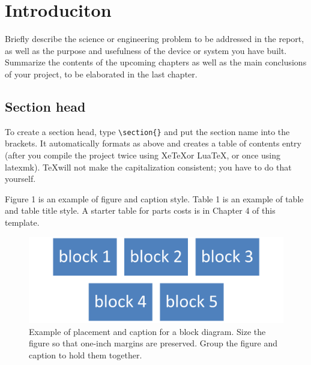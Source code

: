 \chapter{Introduciton}
Briefly describe the science or engineering problem to be addressed in the report, as well as the purpose and usefulness of the device or system you have built. Summarize the contents of the upcoming chapters as well as the main conclusions of your project, to be elaborated in the last chapter.

\section{Section head}
To create a section head, type \verb|\section{}| and put the section name into the brackets. It automatically formats as above and creates a table of contents entry (after you compile the project twice using Xe\TeX or Lua\TeX, or once using latexmk). \TeX will not make the capitalization consistent; you have to do that yourself.

Figure 1 is an example of figure and caption style. Table 1 is an example of table and table title style. A starter table for parts costs is in Chapter 4 of this template.

\begin{figure}[H]
    \centering
    \includegraphics[width=\textwidth]{figs/Picture1.png}
    \caption{Example of placement and caption for a block diagram. Size the figure so that one-inch margins are preserved. Group the figure and caption to hold them together.}
\end{figure}
